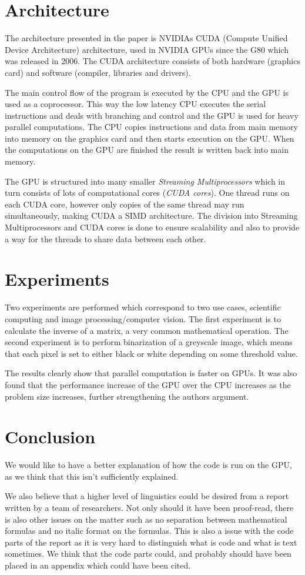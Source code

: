 \documentclass[titlepage, a4paper]{article}
\begin{document}
\section{Architecture}\label{sec:arch}
The architecture presented in the paper is NVIDIAs CUDA (Compute Unified Device Architecture) architecture, used in NVIDIA GPUs since the G80 which was released in 2006. The CUDA architecture consists of both hardware (graphics card) and software (compiler, libraries and drivers).

The main control flow of the program is executed by the CPU and the GPU is used as a coprocessor. This way the low latency CPU executes the serial instructions and deals with branching and control and the GPU is used for heavy parallel computations. The CPU copies instructions and data from main memory into memory on the graphics card and then starts execution on the GPU. When the computations on the GPU are finished the result is written back into main memory.

The GPU is structured into many smaller \textit{Streaming Multiprocessors} which in turn consists of lots of computational cores (\textit{CUDA cores}). One thread runs on each CUDA core, however only copies of the same thread may run simultaneously, making CUDA a SIMD architecture. The division into Streaming Multiprocessors and CUDA cores is done to ensure scalability and also to provide a way for the threads to share data between each other.

\section{Experiments}\label{sec:results}
Two experiments are performed which correspond to two use cases, scientific computing and image processing/computer vision. The first experiment is to calculate the inverse of a matrix, a very common mathematical operation. The second experiment is to perform binarization of a greyscale image, which means that each pixel is set to either black or white depending on some threshold value.

The results clearly show that parallel computation is faster on GPUs. It was also found that the performance increase of the GPU over the CPU increases as the problem size increases, further strengthening the authors argument. 

\section{Conclusion}\label{sec:conclusion}
We would like to have a better explanation of how the code is run on the GPU, as we think that this isn't sufficiently explained.

We also believe that a higher level of linguistics could be desired from a report written by a team of researchers. Not only should it have been proof-read, there is also other issues on the matter such as no separation between mathematical formulas and no italic format on the formulas. This is also a issue with the code parts of the report as it is very hard to distinguish what is code and what is text sometimes. We think that the code parts could, and probably should have been placed in an appendix which could have been cited.
\end{document}
